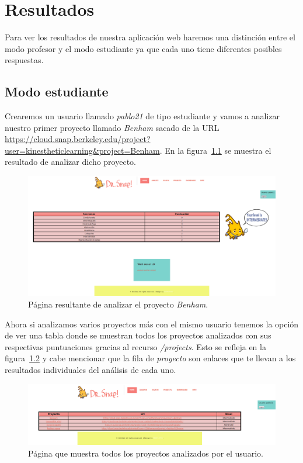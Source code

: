 \documentclass[a4paper, 12pt]{book}
\begin{document}
\cleardoublepage
\chapter{Resultados}

Para ver los resultados de nuestra aplicación web haremos una distinción entre el modo profesor y el modo estudiante ya que cada uno tiene diferentes posibles respuestas.
\section{Modo estudiante}
Crearemos un usuario llamado \textit{pablo21} de tipo estudiante y vamos a analizar nuestro primer proyecto llamado \textit{Benham}  sacado de la URL \url{https://cloud.snap.berkeley.edu/project?user=kinestheticlearning&project=Benham}. En la figura~\ref{figura:Benham} se muestra el resultado de analizar dicho proyecto.

\begin{figure}[h]
            \centering
           \includegraphics[scale=0.25]{img/ej-estudiante.png}
            \caption{Página resultante de analizar el proyecto \textit{Benham}.}
             \label{figura:Benham}
        \end{figure}

Ahora si analizamos varios proyectos más con el mismo usuario tenemos la opción de ver una tabla donde se muestran todos los proyectos analizados con sus respectivas puntuaciones gracias al recurso \textit{/projects}.  Esto se refleja en la figura~\ref{figura:project-es} y cabe mencionar que la fila de \textit{proyecto} son enlaces que te llevan a los resultados individuales del análisis de cada uno.

\begin{figure}[h]
            \centering
           \includegraphics[scale=0.3]{img/projects-estudiante.png}
            \caption{Página que muestra todos los proyectos analizados por el usuario.}
             \label{figura:project-es}
        \end{figure}
        
\end{document}
